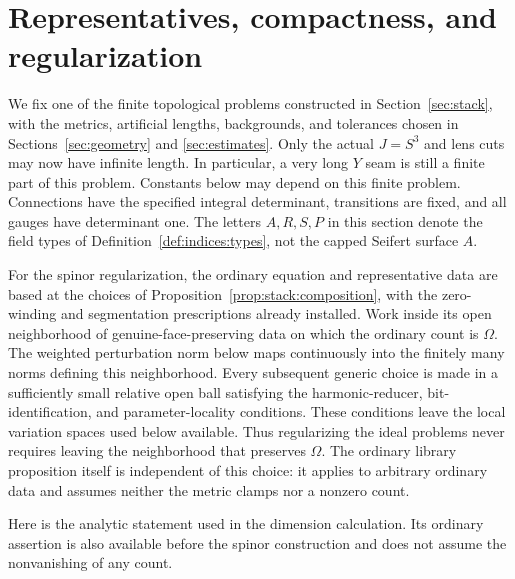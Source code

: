 \section{Representatives, compactness, and regularization}
\label{sec:analysis}

We fix one of the finite topological problems constructed in
Section~\ref{sec:stack}, with the metrics, artificial lengths, backgrounds,
and tolerances chosen in Sections~\ref{sec:geometry} and
\ref{sec:estimates}.  Only the actual $J=S^3$ and lens cuts may now have
infinite length.  In particular, a very long $Y$ seam is still a finite
part of this problem.  Constants below may depend on this finite problem.
Connections have the specified integral determinant, transitions are fixed,
and all gauges have determinant one.  The letters $A,R,S,P$ in this section
denote the field types of Definition~\ref{def:indices:types}, not the capped
Seifert surface $A$.

For the spinor regularization, the ordinary equation and representative
data are based at the choices
of Proposition~\ref{prop:stack:composition}, with the zero-winding and
segmentation prescriptions already installed.  Work inside its open
neighborhood of genuine-face-preserving data on which the ordinary
count is $\Omega$.  The weighted perturbation norm below maps
continuously into the finitely many norms defining this neighborhood.
Every subsequent generic choice is made in a sufficiently small relative
open ball satisfying the harmonic-reducer, bit-identification, and
parameter-locality conditions.  These conditions leave the local
variation spaces used below available.  Thus regularizing the ideal
problems never requires leaving the neighborhood that preserves $\Omega$.
The ordinary library proposition itself is independent of this choice:
it applies to arbitrary ordinary data and assumes neither the metric
clamps nor a nonzero count.

Here is the analytic statement used in the dimension calculation.  Its
ordinary assertion is also available before the spinor construction and
does not assume the nonvanishing of any count.

